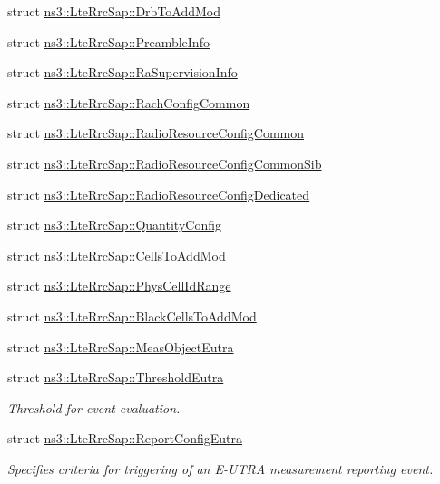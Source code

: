 \begin{DoxyCompactItemize}
struct \hyperlink{structns3_1_1LteRrcSap_1_1DrbToAddMod}{ns3\+::\+Lte\+Rrc\+Sap\+::\+Drb\+To\+Add\+Mod}
\item 
struct \hyperlink{structns3_1_1LteRrcSap_1_1PreambleInfo}{ns3\+::\+Lte\+Rrc\+Sap\+::\+Preamble\+Info}
\item 
struct \hyperlink{structns3_1_1LteRrcSap_1_1RaSupervisionInfo}{ns3\+::\+Lte\+Rrc\+Sap\+::\+Ra\+Supervision\+Info}
\item 
struct \hyperlink{structns3_1_1LteRrcSap_1_1RachConfigCommon}{ns3\+::\+Lte\+Rrc\+Sap\+::\+Rach\+Config\+Common}
\item 
struct \hyperlink{structns3_1_1LteRrcSap_1_1RadioResourceConfigCommon}{ns3\+::\+Lte\+Rrc\+Sap\+::\+Radio\+Resource\+Config\+Common}
\item 
struct \hyperlink{structns3_1_1LteRrcSap_1_1RadioResourceConfigCommonSib}{ns3\+::\+Lte\+Rrc\+Sap\+::\+Radio\+Resource\+Config\+Common\+Sib}
\item 
struct \hyperlink{structns3_1_1LteRrcSap_1_1RadioResourceConfigDedicated}{ns3\+::\+Lte\+Rrc\+Sap\+::\+Radio\+Resource\+Config\+Dedicated}
\item 
struct \hyperlink{structns3_1_1LteRrcSap_1_1QuantityConfig}{ns3\+::\+Lte\+Rrc\+Sap\+::\+Quantity\+Config}
\item 
struct \hyperlink{structns3_1_1LteRrcSap_1_1CellsToAddMod}{ns3\+::\+Lte\+Rrc\+Sap\+::\+Cells\+To\+Add\+Mod}
\item 
struct \hyperlink{structns3_1_1LteRrcSap_1_1PhysCellIdRange}{ns3\+::\+Lte\+Rrc\+Sap\+::\+Phys\+Cell\+Id\+Range}
\item 
struct \hyperlink{structns3_1_1LteRrcSap_1_1BlackCellsToAddMod}{ns3\+::\+Lte\+Rrc\+Sap\+::\+Black\+Cells\+To\+Add\+Mod}
\item 
struct \hyperlink{structns3_1_1LteRrcSap_1_1MeasObjectEutra}{ns3\+::\+Lte\+Rrc\+Sap\+::\+Meas\+Object\+Eutra}
\item 
struct \hyperlink{structns3_1_1LteRrcSap_1_1ThresholdEutra}{ns3\+::\+Lte\+Rrc\+Sap\+::\+Threshold\+Eutra}
\begin{DoxyCompactList}\small\item\em Threshold for event evaluation. \end{DoxyCompactList}\item 
struct \hyperlink{structns3_1_1LteRrcSap_1_1ReportConfigEutra}{ns3\+::\+Lte\+Rrc\+Sap\+::\+Report\+Config\+Eutra}
\begin{DoxyCompactList}\small\item\em Specifies criteria for triggering of an E-\/\+U\+T\+RA measurement reporting event. \end{DoxyCompactList}\item 

\end{DoxyCompactItemize}
